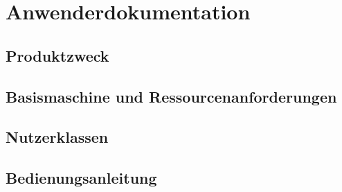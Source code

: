 \chapter{Anwenderdokumentation}
\section{Produktzweck}

\section{Basismaschine und Ressourcenanforderungen}

\section{Nutzerklassen}

\section{Bedienungsanleitung}
